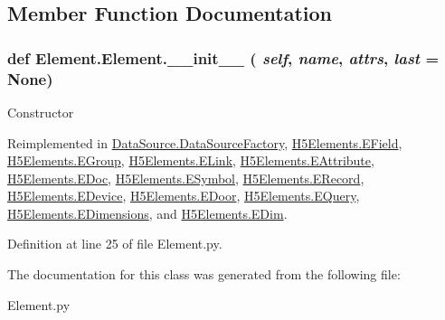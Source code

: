 \subsection{Member Function Documentation}
\hypertarget{classElement_1_1Element_a359371465b7c4d21611adec7e86c3b33}{
\subsubsection[{\_\-\_\-init\_\-\_\-}]{\setlength{\rightskip}{0pt plus 5cm}def Element.Element.\_\-\_\-init\_\-\_\- ( {\em self}, \/   {\em name}, \/   {\em attrs}, \/   {\em last} = {\ttfamily None})}}
\label{classElement_1_1Element_a359371465b7c4d21611adec7e86c3b33}
\begin{DoxyVerb}Constructor \end{DoxyVerb}
 

Reimplemented in \hyperlink{classDataSource_1_1DataSourceFactory_a9cfa373f259e0f9b21c9f1624fb7b517}{DataSource.DataSourceFactory}, \hyperlink{classH5Elements_1_1EField_ad58a5277143c1a17c5e004c92081d937}{H5Elements.EField}, \hyperlink{classH5Elements_1_1EGroup_a3ab898c36d1fa91a226417a3296a651b}{H5Elements.EGroup}, \hyperlink{classH5Elements_1_1ELink_a15f6a1e9476b5ef916b597243a79b0e8}{H5Elements.ELink}, \hyperlink{classH5Elements_1_1EAttribute_a42067c9a356fa17bbeb49de2acf9c438}{H5Elements.EAttribute}, \hyperlink{classH5Elements_1_1EDoc_a1680abdb0cd1799968e6661a70d1d341}{H5Elements.EDoc}, \hyperlink{classH5Elements_1_1ESymbol_ae29345c630720f8c56b66c6ab74c39be}{H5Elements.ESymbol}, \hyperlink{classH5Elements_1_1ERecord_a11c91d973c319626d283c13a2679140b}{H5Elements.ERecord}, \hyperlink{classH5Elements_1_1EDevice_a2ef0d670208549cb7eeafe75af802368}{H5Elements.EDevice}, \hyperlink{classH5Elements_1_1EDoor_ae4bda86f18b9555bc435883e109415a9}{H5Elements.EDoor}, \hyperlink{classH5Elements_1_1EQuery_a4762ac1d81b6253845dc4a179880ffd9}{H5Elements.EQuery}, \hyperlink{classH5Elements_1_1EDimensions_ac573211ddcc848f54103d9c68c903e6c}{H5Elements.EDimensions}, and \hyperlink{classH5Elements_1_1EDim_ad40b269d818a529b5fbd09cab4d29d12}{H5Elements.EDim}.

Definition at line 25 of file Element.py.

The documentation for this class was generated from the following file:\begin{DoxyCompactItemize}
\item 
Element.py\end{DoxyCompactItemize}
